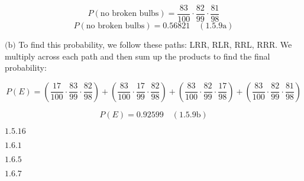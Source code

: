 \documentclass{article}
\newcommand{\problem}[2]{$\boxed{\text{#1.#2}}$}
\newcommand{\subproblem}[3]{$\boxed{\text{(#3)}}$}
\newcommand{\subsolution}[4]{\boxed{#4\quad(\text{#1.#2#3})}}
\begin{document}
\[
P(\text{no broken bulbs})=\dfrac{83}{100}\cdot\dfrac{82}{99}\cdot\dfrac{81}{98}
\] \[
\subsolution{1.5}{9}{a}{P(\text{no broken bulbs})=0.56821}
\]

\subproblem{1.5}{9}{b} To find this probability, we follow these
paths: LRR, RLR, RRL, RRR. We multiply across each path and then sum
up the products to find the final probability:

\[
P(E)=
\left(\dfrac{17}{100}\cdot
\dfrac{83}{99}\cdot
\dfrac{82}{98}\right)
+
\left(\dfrac{83}{100}\cdot
\dfrac{17}{99}\cdot
\dfrac{82}{98}\right)
+
\left(\dfrac{83}{100}\cdot
\dfrac{82}{99}\cdot
\dfrac{17}{98}\right)
+
\left(\dfrac{83}{100}\cdot
\dfrac{82}{99}\cdot
\dfrac{81}{98}\right)
\]

\[
\subsolution{1.5}{9}{b}{P(E)=0.92599}
\]


\problem{1.5}{16}




\problem{1.6}{1}




\problem{1.6}{5}




\problem{1.6}{7}
\end{document}
